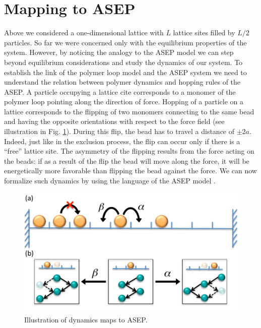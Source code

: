 \documentclass[aps,showpacs,twocolumn,floatfix,prx,superscriptaddress]{revtex4-1}
\begin{document}
\section{Mapping to ASEP}\label{sec:asep}
Above we considered a one-dimensional lattice with $L$ lattice sites filled by
 $L/2$ particles. So far we were concerned only with the equilibrium properties
 of the system. However, by noticing the analogy to the ASEP model we can step
 beyond equilibrium considerations and study the dynamics of our system. To
 establish the link of the polymer loop model and the ASEP system we need to
 understand the relation between polymer dynamics and hopping rules of the ASEP.
 A particle occupying a lattice cite corresponds to a monomer of the polymer
 loop pointing along the direction of force. Hopping of a particle on a lattice
 corresponds to the flipping of two monomers connecting to the same bead and
 having the opposite orientations with respect to the force field (see
 illustration in Fig. \ref{fig:asep}). During this flip, the bead has to travel a distance of $\pm2a$. Indeed, just like in the exclusion process, the flip can occur only if there is a ``free'' lattice site. The asymmetry of the flipping results from the force acting on the beads: if as a result of the flip the bead will move along the force, it will be energetically more favorable than flipping the bead against the force. We can now formalize such dynamics by using the language of the ASEP model \cite{Derrida1998,Schutz2001}. 
 \begin{figure}[htpb]
     \centering
     \includegraphics[width=1.0\linewidth]{asep}
     \caption{Illustration of dynamics maps to ASEP.}
     \label{fig:asep}
 \end{figure}
\end{document}
